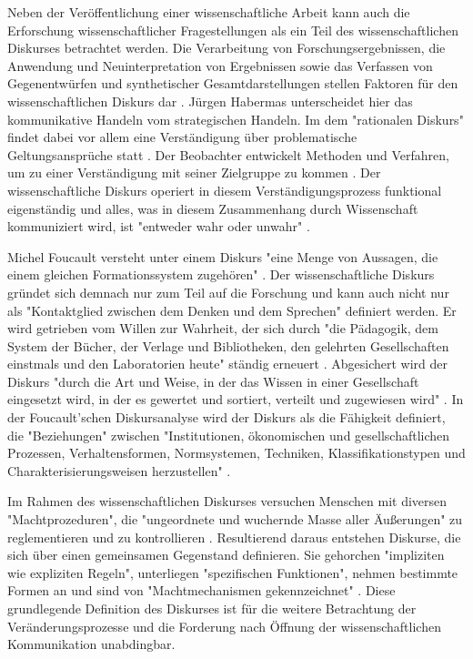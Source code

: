 Neben der Veröffentlichung einer wissenschaftliche Arbeit kann auch die Erforschung wissenschaftlicher Fragestellungen als ein Teil des wissenschaftlichen Diskurses betrachtet werden. Die Verarbeitung von Forschungsergebnissen, die Anwendung und Neuinterpretation von Ergebnissen sowie das Verfassen von Gegenentwürfen und synthetischer Gesamtdarstellungen stellen Faktoren für den wissenschaftlichen Diskurs dar \cite{Gruber_2005}. Jürgen Habermas unterscheidet hier das kommunikative Handeln vom strategischen Handeln. Im dem "rationalen Diskurs" findet dabei vor allem eine Verständigung über problematische Geltungsansprüche statt \cite{Habermas_1981}. Der Beobachter entwickelt Methoden und Verfahren, um zu einer Verständigung mit seiner Zielgruppe zu kommen \cite[:221]{Luhmann_2015}. Der wissenschaftliche Diskurs operiert in diesem Verständigungsprozess funktional eigenständig und alles, was in diesem Zusammenhang durch Wissenschaft kommuniziert wird, ist "entweder wahr oder unwahr" \cite[:73]{Luhmann_1998}.

Michel Foucault versteht unter einem Diskurs "eine Menge von Aussagen, die einem gleichen Formationssystem zugehören" \cite{Foucault_1981}. Der wissenschaftliche Diskurs gründet sich demnach nur zum Teil auf die Forschung und kann auch nicht nur als "Kontaktglied zwischen dem Denken und dem Sprechen" \cite{Foucault_2003} definiert werden. Er wird getrieben vom Willen zur Wahrheit, der sich durch "die Pädagogik, dem System der Bücher, der Verlage und Bibliotheken, den gelehrten Gesellschaften einstmals und den Laboratorien heute" ständig erneuert \cite{Foucault_2003}. Abgesichert wird der Diskurs "durch die Art und Weise, in der das Wissen in einer Gesellschaft eingesetzt wird, in der es gewertet und sortiert, verteilt und zugewiesen wird" \cite{Foucault_2003}. In der Foucault'schen Diskursanalyse wird der Diskurs als die Fähigkeit definiert, die "Beziehungen" zwischen "Institutionen, ökonomischen und gesellschaftlichen Prozessen, Verhaltensformen, Normsystemen, Techniken, Klassifikationstypen und Charakterisierungsweisen herzustellen" \cite{Foucault_1981}.

Im Rahmen des wissenschaftlichen Diskurses versuchen Menschen mit diversen "Machtprozeduren", die "ungeordnete und wuchernde Masse aller Äußerungen" zu reglementieren und zu kontrollieren \cite{Neymeyer_2010}. Resultierend daraus entstehen Diskurse, die sich über einen gemeinsamen Gegenstand definieren. Sie gehorchen "impliziten wie expliziten Regeln", unterliegen "spezifischen Funktionen", nehmen bestimmte Formen an und sind von "Machtmechanismen gekennzeichnet" \cite{Neymeyer_2010}. Diese grundlegende Definition des Diskurses ist für die weitere Betrachtung der Veränderungsprozesse und die Forderung nach Öffnung der wissenschaftlichen Kommunikation unabdingbar.

